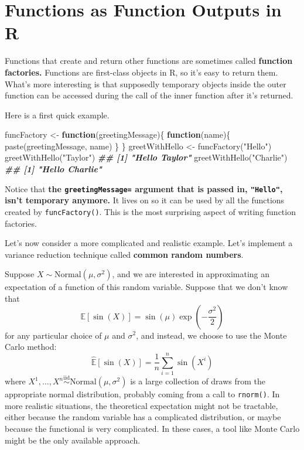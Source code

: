 \documentclass[
  12pt,
  krantz2]{krantz}
\makeatletter
\newenvironment{Shaded}{\begin{snugshade}}{\end{snugshade}}
\newcommand{\ControlFlowTok}[1]{\textcolor[rgb]{0.27,0.27,0.27}{\textbf{#1}}}
\newcommand{\DocumentationTok}[1]{\textcolor[rgb]{0.37,0.37,0.37}{\textbf{\textit{#1}}}}
\newcommand{\FunctionTok}[1]{\textcolor[rgb]{0,0,0}{#1}}
\newcommand{\NormalTok}[1]{#1}
\newcommand{\OtherTok}[1]{\textcolor[rgb]{0.37,0.37,0.37}{#1}}
\newcommand{\StringTok}[1]{\textcolor[rgb]{0.5,0.5,0.5}{#1}}
\newenvironment{kframe}{%
\medskip{}
\setlength{\fboxsep}{.8em}
 \def\at@end@of@kframe{}%
 \ifinner\ifhmode%
  \def\at@end@of@kframe{\end{minipage}}%
  \begin{minipage}{\columnwidth}%
 \fi\fi%
 \def\FrameCommand##1{\hskip\@totalleftmargin \hskip-\fboxsep
 \colorbox{shadecolor}{##1}\hskip-\fboxsep
     \hskip-\linewidth \hskip-\@totalleftmargin \hskip\columnwidth}%
 \MakeFramed {\advance\hsize-\width
   \@totalleftmargin\z@ \linewidth\hsize
   \@setminipage}}%
 {\par\unskip\endMakeFramed%
 \at@end@of@kframe}
\renewenvironment{Shaded}{\begin{kframe}}{\end{kframe}}
\makeatother
\begin{document}
\hypertarget{functions-as-function-outputs-in-r}{%
\section{Functions as Function Outputs in R}\label{functions-as-function-outputs-in-r}}

Functions that create and return other functions are sometimes called \textbf{function factories.} Functions are first-class objects in R, so it's easy to return them. What's more interesting is that supposedly temporary objects inside the outer function can be accessed during the call of the inner function after it's returned.

Here is a first quick example.

\begin{Shaded}
\begin{Highlighting}[]
\NormalTok{funcFactory }\OtherTok{\textless{}{-}} \ControlFlowTok{function}\NormalTok{(greetingMessage)\{}
  \ControlFlowTok{function}\NormalTok{(name)\{}
    \FunctionTok{paste}\NormalTok{(greetingMessage, name)}
\NormalTok{  \}}
\NormalTok{\}}
\NormalTok{greetWithHello }\OtherTok{\textless{}{-}} \FunctionTok{funcFactory}\NormalTok{(}\StringTok{"Hello"}\NormalTok{)}
\FunctionTok{greetWithHello}\NormalTok{(}\StringTok{"Taylor"}\NormalTok{)}
\DocumentationTok{\#\# [1] "Hello Taylor"}
\FunctionTok{greetWithHello}\NormalTok{(}\StringTok{"Charlie"}\NormalTok{)}
\DocumentationTok{\#\# [1] "Hello Charlie"}
\end{Highlighting}
\end{Shaded}

Notice that \textbf{the \texttt{greetingMessage=} argument that is passed in, \texttt{"Hello"}, isn't temporary anymore.} It lives on so it can be used by all the functions created by \texttt{funcFactory()}. This is the most surprising aspect of writing function factories.

Let's now consider a more complicated and realistic example. Let's implement a variance reduction technique called \textbf{common random numbers}.

Suppose \(X \sim \text{Normal}(\mu, \sigma^2)\), and we are interested in approximating an expectation of a function of this random variable. Suppose that we don't know that
\[
\mathbb{E}[\sin(X)] = \sin(\mu) \exp\left(-\frac{\sigma^2}{2}\right)
\]
for any particular choice of \(\mu\) and \(\sigma^2\), and instead, we choose to use the Monte Carlo method:
\[
\hat{\mathbb{E}}[\sin(X)] = \frac{1}{n}\sum_{i=1}^n\sin(X^i)
\]
where \(X^1, \ldots, X^n \overset{\text{iid}}{\sim} \text{Normal}(\mu, \sigma^2)\) is a large collection of draws from the appropriate normal distribution, probably coming from a call to \texttt{rnorm()}. In more realistic situations, the theoretical expectation might not be tractable, either because the random variable has a complicated distribution, or maybe because the functional is very complicated. In these cases, a tool like Monte Carlo might be the only available approach.
\end{document}
